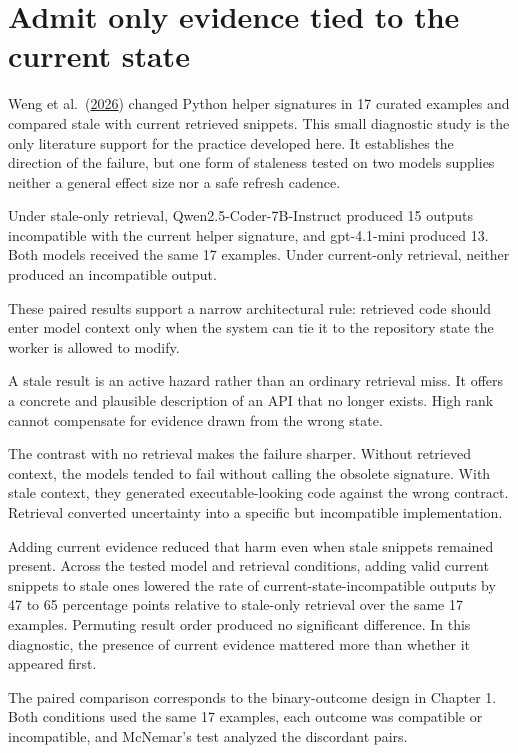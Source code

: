 \hypertarget{admit-only-evidence-tied-to-the-current-state}{%
\section{Admit only evidence tied to the current state}\label{admit-only-evidence-tied-to-the-current-state}}

Weng et al.~(\href{https://arxiv.org/abs/2605.14478}{2026}) changed Python helper signatures in 17 curated examples and compared stale with current retrieved snippets. This small diagnostic study is the only literature support for the practice developed here. It establishes the direction of the failure, but one form of staleness tested on two models supplies neither a general effect size nor a safe refresh cadence.

Under stale-only retrieval, Qwen2.5-Coder-7B-Instruct produced 15 outputs incompatible with the current helper signature, and gpt-4.1-mini produced 13. Both models received the same 17 examples. Under current-only retrieval, neither produced an incompatible output.

These paired results support a narrow architectural rule: retrieved code should enter model context only when the system can tie it to the repository state the worker is allowed to modify.

A stale result is an active hazard rather than an ordinary retrieval miss. It offers a concrete and plausible description of an API that no longer exists. High rank cannot compensate for evidence drawn from the wrong state.

The contrast with no retrieval makes the failure sharper. Without retrieved context, the models tended to fail without calling the obsolete signature. With stale context, they generated executable-looking code against the wrong contract. Retrieval converted uncertainty into a specific but incompatible implementation.

Adding current evidence reduced that harm even when stale snippets remained present. Across the tested model and retrieval conditions, adding valid current snippets to stale ones lowered the rate of current-state-incompatible outputs by 47 to 65 percentage points relative to stale-only retrieval over the same 17 examples. Permuting result order produced no significant difference. In this diagnostic, the presence of current evidence mattered more than whether it appeared first.

The paired comparison corresponds to the binary-outcome design in Chapter 1. Both conditions used the same 17 examples, each outcome was compatible or incompatible, and McNemar's test analyzed the discordant pairs.

